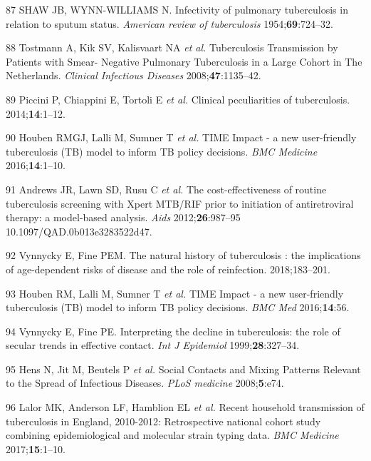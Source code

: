 \documentclass[11pt,twoside]{bristolthesis}
\begin{document}
  \leavevmode\hypertarget{ref-PMID:13148535}{}%
  87 SHAW JB, WYNN-WILLIAMS N. Infectivity of pulmonary tuberculosis in relation to sputum status. \emph{American review of tuberculosis} 1954;\textbf{69}:724--32.
  
  \leavevmode\hypertarget{ref-Tostmann2008}{}%
  88 Tostmann A, Kik SV, Kalisvaart NA \emph{et al.} Tuberculosis Transmission by Patients with Smear- Negative Pulmonary Tuberculosis in a Large Cohort in The Netherlands. \emph{Clinical Infectious Diseases} 2008;\textbf{47}:1135--42.
  
  \leavevmode\hypertarget{ref-Piccini2014}{}%
  89 Piccini P, Chiappini E, Tortoli E \emph{et al.} Clinical peculiarities of tuberculosis. 2014;\textbf{14}:1--12.
  
  \leavevmode\hypertarget{ref-Houben2016}{}%
  90 Houben RMGJ, Lalli M, Sumner T \emph{et al.} TIME Impact - a new user-friendly tuberculosis (TB) model to inform TB policy decisions. \emph{BMC Medicine} 2016;\textbf{14}:1--10.
  
  \leavevmode\hypertarget{ref-Andrews2012}{}%
  91 Andrews JR, Lawn SD, Rusu C \emph{et al.} The cost-effectiveness of routine tuberculosis screening with Xpert MTB/RIF prior to initiation of antiretroviral therapy: a model-based analysis. \emph{Aids} 2012;\textbf{26}:987--95 10.1097/QAD.0b013e3283522d47.
  
  \leavevmode\hypertarget{ref-Vynnycky1997}{}%
  92 Vynnycky E, Fine PEM. The natural history of tuberculosis : the implications of age-dependent risks of disease and the role of reinfection. 2018;183--201.
  
  \leavevmode\hypertarget{ref-Houben2016a}{}%
  93 Houben RM, Lalli M, Sumner T \emph{et al.} TIME Impact - a new user-friendly tuberculosis (TB) model to inform TB policy decisions. \emph{BMC Med} 2016;\textbf{14}:56.
  
  \leavevmode\hypertarget{ref-Vynnycky1999}{}%
  94 Vynnycky E, Fine PE. Interpreting the decline in tuberculosis: the role of secular trends in effective contact. \emph{Int J Epidemiol} 1999;\textbf{28}:327--34.
  
  \leavevmode\hypertarget{ref-Mossong2008}{}%
  95 Hens N, Jit M, Beutels P \emph{et al.} Social Contacts and Mixing Patterns Relevant to the Spread of Infectious Diseases. \emph{PLoS medicine} 2008;\textbf{5}:e74.
  
  \leavevmode\hypertarget{ref-Lalor2017}{}%
  96 Lalor MK, Anderson LF, Hamblion EL \emph{et al.} Recent household transmission of tuberculosis in England, 2010-2012: Retrospective national cohort study combining epidemiological and molecular strain typing data. \emph{BMC Medicine} 2017;\textbf{15}:1--10.
  
\end{document}
